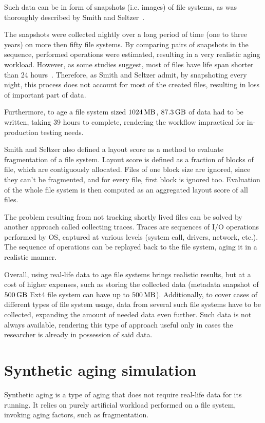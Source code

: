 \documentclass[
  color, %
  table, %
  lof,   %
  lot,   %
]{fithesis3}
\begin{document}
Such data can be in form of snapshots (i.e. images) of file systems, as was thoroughly described by Smith and Seltzer~\cite{Smith:1997:FSA:258623.258689}.

The snapshots were collected nightly over a long period of time (one to three years) on more then fifty file systems. By comparing pairs of snapshots in the sequence, performed operations were estimated, resulting in a very realistic aging workload. However, as some studies suggest, most of files have life span shorter than 24 hours~\cite{Ousterhout:1985:TAU:323647.323631}. Therefore, as Smith and Seltzer admit, by snapshoting every night, this process does not account for most of the created files, resulting in loss of important part of data.

Furthermore, to age a file system sized $\SI{1024}{\mega\byte}$, $\SI{87.3}{\giga\byte}$ of data had to be written, taking 39 hours to complete, rendering the workflow impractical for in-production testing needs.

Smith and Seltzer also defined a layout score as a method to evaluate fragmentation of a file system. Layout score is defined as a fraction of blocks of file, which are contiguously allocated. Files of one block size are ignored, since they can't be fragmented, and for every file, first block is ignored too. Evaluation of the whole file system is then computed as an aggregated layout score of all files.

The problem resulting from not tracking shortly lived files can be solved by another approach called collecting traces. Traces are sequences of I/O operations performed by OS, captured at various levels (system call, drivers, network, etc.). The sequence of operations can be replayed back to the file system, aging it in a realistic manner.

Overall, using real-life data to age file systems brings realistic results, but at a cost of higher expenses, such as storing the collected data (metadata snapshot of $\SI{500}{\giga\byte}$ Ext4 file system can have up to $\SI{500}{\mega\byte}$). Additionally, to cover cases of different types of file system usage, data from several such file systems have to be collected, expanding the amount of needed data even further. Such data is not always available, rendering this type of approach useful only in cases the researcher is already in possession of said data.

\section{Synthetic aging simulation}
Synthetic aging is a type of aging that does not require real-life data for its running. It relies on purely artificial workload performed on a file system, invoking aging factors, such as fragmentation.
\end{document}
